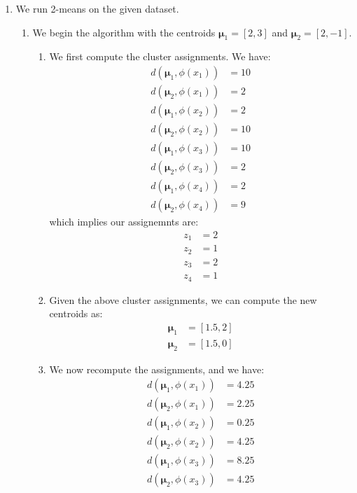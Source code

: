 \documentclass[12pt]{article}
\begin{document}
\begin{enumerate}[label=(\alph*)]
  \item We run 2-means on the given dataset.
    \begin{enumerate}
      \item We begin the algorithm with the centroids $\bm{\mu}_1 = [2,3]$ and $\bm{\mu}_2 = [2,-1]$.
      \begin{enumerate}[label=(\arabic*)]
        \item We first compute the cluster assignments. We have:
        \begin{align*}
          d(\bm{\mu}_1, \phi(x_1)) &= 10\\
          d(\bm{\mu}_2, \phi(x_1)) &= 2 \\
          d(\bm{\mu}_1, \phi(x_2)) &= 2 \\
          d(\bm{\mu}_2, \phi(x_2)) &= 10 \\
          d(\bm{\mu}_1, \phi(x_3)) &= 10\\
          d(\bm{\mu}_2, \phi(x_3)) &= 2 \\
          d(\bm{\mu}_1, \phi(x_4)) &= 2 \\
          d(\bm{\mu}_2, \phi(x_4)) &= 9
        \end{align*}
        which implies our assignemnts are:
        \begin{align*}
          z_1 &= 2 \\
          z_2 &= 1 \\
          z_3 &= 2 \\
          z_4 &= 1
        \end{align*}
      \item Given the above cluster assignments, we can compute the new centroids as:
      \begin{align*}
        \bm{\mu}_1 &= [1.5, 2] \\
        \bm{\mu}_2 &= [1.5, 0]
      \end{align*}
      \item We now recompute the assignments, and we have:
      \begin{align*}
        d(\bm{\mu}_1, \phi(x_1)) &= 4.25\\
        d(\bm{\mu}_2, \phi(x_1)) &= 2.25 \\
        d(\bm{\mu}_1, \phi(x_2)) &= 0.25 \\
        d(\bm{\mu}_2, \phi(x_2)) &= 4.25 \\
        d(\bm{\mu}_1, \phi(x_3)) &= 8.25 \\
        d(\bm{\mu}_2, \phi(x_3)) &= 4.25 \\

\end{align*}
\end{enumerate}
\end{enumerate}
\end{enumerate}
\end{document}
